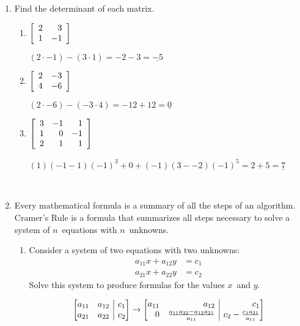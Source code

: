 \documentclass{letter}
\makeatletter
\newcommand{\?}{\stackrel{?}{=}}
\newcommand\Que[1]{%
   \leavevmode\noindent
   #1
}
\newcommand\Ans[2][]{%
   \leavevmode\noindent
   {
       \begin{mdframed}[backgroundcolor=blue!10]
       #2
       \end{mdframed}
   }
}
\newenvironment{Mat}[1]{%
  \left[\begin{array}{*{#1}{r}}
}{%
  \end{array}\right]
}
\newenvironment{Amat}[1]{%
  \left[\begin{array}{@{}*{#1}{r}|r@{}}
}{%
  \end{array}\right]
}
\makeatother
\begin{document}
\begin{enumerate}
    \item Find the determinant of each matrix.
    \begin{enumerate}
    \item $\begin{Mat}{2} 2 & 3 \\ 1 & -1 \end{Mat}$
    \Ans{
       $(2\cdot -1)-(3\cdot 1) = -2 - 3 = \underline{-5}$
    }
    \item $\begin{Mat}{2} 2 & -3 \\ 4 & -6 \end{Mat}$ 
    \Ans{
       $(2\cdot -6)-(-3\cdot 4) = -12+12 = \underline{0}$
    }    
    \item $\begin{Mat}{3} 3 & -1 &  1 \\ 
                          1 &  0 & -1 \\ 
                          2 &  1 &  1 \end{Mat}$ 
    \Ans{
       $(1)(-1-1)(-1)^3 + 0 + (-1)(3--2)(-1)^5 = 2 + 5 = \underline{7}$
    }    
    \end{enumerate}
    ~\\     
    \item 
       Every mathematical formula is a summary of all the steps of an algorithm.  Cramer's Rule is a formula that summarizes all steps necessary to solve a system of $n$\ equations with $n$\ unknowns.
    \begin{enumerate}[label=(\alph*)]
    \item \Que{
        Consider a system of two equations with two unknowns:
        \begin{align*}
            a_{11}x+a_{12}y &= c_1 \\
            a_{21}x+a_{22}y &= c_2
        \end{align*}       
        Solve this system to produce formulas for the values $x$\ and $y$.
    }
    \Ans{
       \begin{align*}
           \begin{Amat}{2} a_{11} & a_{12} & c_1 \\
                           a_{21} & a_{22} & c_2 \end{Amat}
           &\to
           \begin{Amat}{2} a_{11} &                                a_{12} & c_1 \\
                                0 & \frac{a_{11}a_{22}-a_{12}a_{21}}{a_{11}} & c_2 - \frac{c_1a_{21}}{a_{11}} \end{Amat} \\

\end{align*}}
\end{enumerate}
\end{enumerate}
\end{document}
